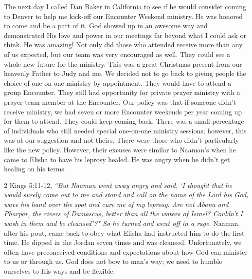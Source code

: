\documentclass[oneside,12pt]{book}
\begin{document}
The next day I called Dan Baker in California to see if he would consider coming to Denver to help me kick-off our Encounter Weekend ministry. He was honored to come and be a part of it. God showed up in an awesome way and demonstrated His love and power in our meetings far beyond what I could ask or think. He was amazing! Not only did those who attended receive more than any of us expected, but our team was very encouraged as well. They could see a whole new future for the ministry. This was a great Christmas present from our heavenly Father to Judy and me. We decided not to go back to giving people the choice of one-on-one ministry by appointment. They would have to attend a group Encounter. They still had opportunity for private prayer ministry with a prayer team member at the Encounter. Our policy was that if someone didn't receive ministry, we had seven or more Encounter weekends per year coming up for them to attend. They could keep coming back. There was a small percentage of individuals who still needed special one-on-one ministry sessions; however, this was at our suggestion and not theirs. There were those who didn't particularly like the new policy. However, their excuses were similar to Naaman's when he came to Elisha to have his leprosy healed. He was angry when he didn't get healing on his terms.

2 Kings 5:11-12, \textit{``But Naaman went away angry and said, `I thought that he would surely come out to me and stand and call on the name of the Lord his God, wave his hand over the spot and cure me of my leprosy. Are not Abana and Pharpar, the rivers of Damascus, better than all the waters of Israel? Couldn't I wash in them and be cleansed'?" So he turned and went off in a rage.} Naaman, after his pout, came back to obey what Elisha had instructed him to do the first time. He dipped in the Jordan seven times and was cleansed. Unfortunately, we often have preconceived conditions and expectations about how God can minister to us or through us. God does not bow to man's way; we need to humble ourselves to His ways and be flexible. 
\end{document}
